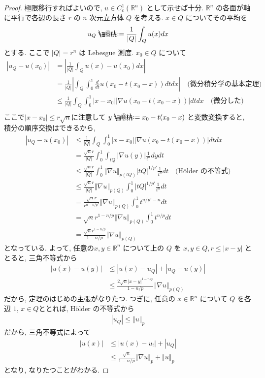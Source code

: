 \documentclass[openany, a4paper, oneside]{jsbook}
\makeatletter
\newcommand*{\defeq}{\mathrel{\rlap{%
\raisebox{0.3ex}{$\m@th\cdot$}}%
\raisebox{-0.3ex}{$\m@th\cdot$}}%
=}
\theoremstyle{break}
\theoremstyle{breakdefn}
\newcommand{\abs}[1]{\left|#1\right|}
\newcommand{\norm}[1]{\left\Vert#1\right\Vert}
\newcommand{\bbR}{\mathbb{R}}
\makeatother
\begin{document}
\begin{proof}
極限移行すればよいので, $u \in C_c^1 (\bbR^n)$ として示せば十分.
$\bbR^n$ の各面が軸に平行で各辺の長さ $r$ の $n$ 次元立方体 $Q$ を考える.
$x \in Q$ についてその平均を
\begin{align}
 u_Q
 \defeq
 \frac{1}{|Q|} \int_Q u (x) dx
\end{align}
とする.
ここで $\abs{Q} = r^n$ は Lebesgue 測度.
$x_0 \in Q$ について
\begin{align}
 \abs{u_Q - u(x_0)}
 &=
 \abs{\frac{1}{|Q|} \int_Q u (x) - u (x_0) dx} \\
 &=
 \frac{1}{|Q|} \abs{\int_Q \int_0^1 \frac{d}{dt} u (x_0 - t (x_0 - x)) dt dx} \quad \text{(微分積分学の基本定理)} \\
 &\le
 \frac{1}{|Q|} \int_Q \int_0^1 \abs{x - x_0} \abs{\nabla u (x_0 - t (x_0 - x))} dt dx \quad \text{(微分した)} \\
\end{align}
ここで$\abs{x - x_0} \le r \sqrt{n}$に注意して $y \defeq x_0 - t (x_0 - x)$ と変数変換すると,
積分の順序交換はできるから,
\begin{align}
 \abs{u_Q - u(x_0)}
 &\le
 \frac{1}{|Q|} \int_Q \int_0^1 \abs{x - x_0} \abs{\nabla u (x_0 - t (x_0 - x))} dt dx \\
 &=
 \frac{\sqrt{n} r}{|Q|} \int_0^1 \int_{tQ} \abs{\nabla u (y)} \frac{1}{t^n} dy dt \\
 &\le
 \frac{\sqrt{n} r}{|Q|} \int_0^1 \norm{\nabla u}_{p (tQ)} \abs{tQ}^{1/{p'}} \frac{1}{t^n} dt \quad \text{(H\"older の不等式)} \\
 &\le
 \frac{\sqrt{n} r}{|Q|} \norm{\nabla u}_{p (Q)} \int_0^1 \abs{tQ}^{1/{p'}} \frac{1}{t^n} dt \\
 &=
 \frac{\sqrt{n} r}{r^{n-n/{p'}}} \norm{\nabla u}_{p (Q)} \int_0^1 t^{n/{p'} - n} dt \\
 &=
 \sqrt{n} r^{1 - n/p} \norm{\nabla u}_{p (Q)} \int_0^1 t^{n/p} dt \\
 &=
 \frac{\sqrt{n} r^{1 - n/p}}{1 - n/p} \norm{\nabla u}_{p (Q)}
\end{align}
となっている.
よって, 任意の$x, y \in \bbR^n$ について上の $Q$ を $x, y \in Q, r \le \abs{x-y}$ ととると,
三角不等式から
\begin{align}
 \abs{u (x) - u (y)}
 &\le
 \abs{u (x) - u_Q} + \abs{u_Q - u (y)} \\
 &\le
 \frac{2\sqrt{n} \abs{x-y}^{1 - n/p}}{1 - n/p} \norm{\nabla u}_{p (Q)}
\end{align}
だから, 定理のはじめの主張がなりたつ.
つぎに, 任意の $x \in \bbR^n$ について $Q$ を各辺 $1$, $x \in Q$ととれば,
H\"older の不等式から
\begin{align}
 \abs{u_Q}
 \le
 \norm{u}_p
\end{align}
だから, 三角不等式によって
\begin{align}
 \abs{u(x)}
 &\le
 \abs{u(x)- u_!} + \abs{u_Q} \\
 &\le
 \frac{\sqrt{n}}{1 - n/p} \norm{\nabla u}_p + \norm{u}_p
\end{align}
となり, なりたつことがわかる.
\end{proof}
\end{document}
